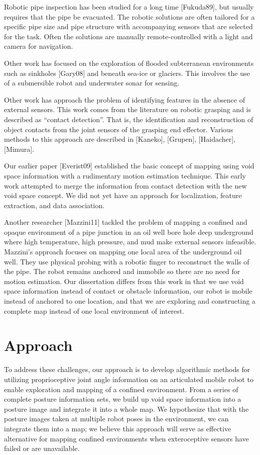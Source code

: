 Robotic pipe inspection has been studied for a long time [Fukuda89], but usually requires that the pipe be evacuated. The robotic solutions are often tailored for a specific pipe size and pipe structure with accompanying sensors that are selected for the task. Often the solutions are manually remote-controlled with a light and camera for navigation.

Other work has focused on the exploration of flooded subterranean environments such as sinkholes [Gary08] and beneath sea-ice or glaciers. This involves the use of a submersible robot and underwater sonar for sensing.

Other work has approach the problem of identifying features in the absence of external sensors. This work comes from the literature on robotic grasping and is described as “contact detection”. That is, the identification and reconstruction of object contacts from the joint sensors of the grasping end effector. Various methods to this approach are described in [Kaneko], [Grupen], [Haidacher], [Mimura].

Our earlier paper [Everist09] established the basic concept of mapping using void space information with a rudimentary motion estimation technique. This early work attempted to merge the information from contact detection with the new void space concept. We did not yet have an approach for localization, feature extraction, and data association.

Another researcher [Mazzini11] tackled the problem of mapping a confined and opaque environment of a pipe junction in an oil well bore hole deep underground where high temperature, high pressure, and mud make external sensors infeasible. Mazzini’s approach focuses on mapping one local area of the underground oil well. They use physical probing with a robotic finger to reconstruct the walls of the pipe. The robot remains anchored and immobile so there are no need for motion estimation. Our dissertation differs from this work in that we use void space information instead of contact or obstacle information, our robot is mobile instead of anchored to one location, and that we are exploring and constructing a complete map instead of one local environment of interest.

\section{Approach}
\label{approach}

To address these challenges, our approach is to develop algorithmic methods for utilizing proprioceptive joint angle information on an articulated mobile robot to enable exploration and mapping of a confined environment. From a series of complete posture information sets, we build up void space information into a posture image and integrate it into a whole map. We hypothesize that with the posture images taken at multiple robot poses in the environment, we can integrate them into a map; we believe this approach will serve as effective alternative for mapping confined environments when exteroceptive sensors have failed or are unavailable.

